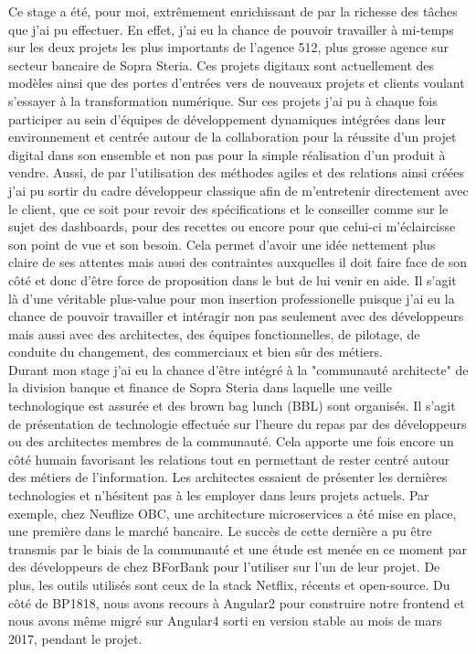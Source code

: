 	Ce stage a été, pour moi, extrêmement enrichissant de par la richesse des tâches que j'ai pu effectuer. En effet, j'ai eu la chance de pouvoir travailler à mi-temps sur les deux projets les plus importants de l'agence 512, plus grosse agence sur secteur bancaire de Sopra Steria. Ces projets digitaux sont actuellement des modèles ainsi que des portes d'entrées vers de nouveaux projets et clients voulant s'essayer à la transformation numérique. Sur ces projets j'ai pu à chaque fois participer au sein d'équipes de développement dynamiques intégrées dans leur environnement et centrée autour de la collaboration pour la réussite d'un projet digital dans son ensemble et non pas pour la simple réalisation d'un produit à vendre. Aussi, de par l'utilisation des méthodes agiles et des relations ainsi créées j'ai pu sortir du cadre développeur classique afin de m'entretenir directement avec le client, que ce soit pour revoir des spécifications et le conseiller comme sur le sujet des dashboards, pour des recettes ou encore pour que celui-ci m'éclaircisse son point de vue et son besoin. Cela permet d'avoir une idée nettement plus claire de ses attentes mais aussi des contraintes auxquelles il doit faire face de son côté et donc d'être force de proposition dans le but de lui venir en aide. Il s'agit là d'une véritable plus-value pour mon insertion professionelle puisque j'ai eu la chance de pouvoir travailler et intéragir non pas seulement avec des développeurs mais aussi avec des architectes, des équipes fonctionnelles, de pilotage, de conduite du changement, des commerciaux et bien sûr des métiers. \\
	
	Durant mon stage j'ai eu la chance d'être intégré à la "communauté architecte" de la division banque et finance de Sopra Steria dans laquelle une veille technologique est assurée et des brown bag lunch (BBL) sont organisés. Il s'agit de présentation de technologie effectuée sur l'heure du repas par des développeurs ou des architectes membres de la communauté. Cela apporte une fois encore un côté humain favorisant les relations tout en permettant de rester centré autour des métiers de l'information. Les architectes essaient de présenter les dernières technologies et n'hésitent pas à les employer dans leurs projets actuels. Par exemple, chez Neuflize OBC, une architecture microservices a été mise en place, une première dans le marché bancaire. Le succès de cette dernière a pu être transmis par le biais de la communauté et une étude est menée en ce moment par des développeurs de chez BForBank pour l'utiliser sur l'un de leur projet. De plus, les outils utilisés sont ceux de la stack Netflix, récents et open-source. Du côté de BP1818, nous avons recours à Angular2 pour construire notre frontend et nous avons même migré sur Angular4 sorti en version stable au mois de mars 2017, pendant le projet. \\
	
